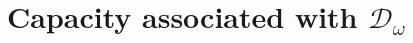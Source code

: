 \documentclass[12pt,reqno,a4paper]{amsart}
\newcommand{\hH}{\mathrm{H^2 }}
\newcommand{\cD}{{\mathcal{D}}}
\numberwithin{equation}{section}
\begin{document}
	
	\section{Capacity associated with $\cD_\omega$}\label{capomega}
	
	
	
\end{document}
